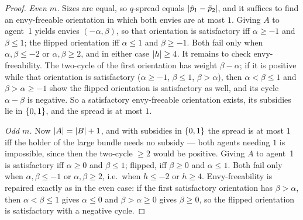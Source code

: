 \begin{proof}
\emph{Even $m$.} Sizes are equal, so $q$-spread equals
$\left\lvert\tilde{p}_1 - \tilde{p}_2\right\rvert$, and it suffices to find an
envy-freeable orientation in which both envies are at most $1$. Giving $A$ to
agent~1 yields envies $(-\alpha, \beta)$, so that orientation is satisfactory
iff $\alpha \ge -1$ and $\beta \le 1$; the flipped orientation iff
$\alpha \le 1$ and $\beta \ge -1$. Both fail only when $\alpha, \beta \le -2$
or $\alpha, \beta \ge 2$, and in either case $\left\lvert h\right\rvert \ge 4$. It remains to
check envy-freeability. The two-cycle of the first orientation has weight
$\beta - \alpha$; if it is positive while that orientation is satisfactory
($\alpha \ge -1$, $\beta \le 1$, $\beta > \alpha$), then $\alpha < \beta \le 1$
and $\beta > \alpha \ge -1$ show the flipped orientation is satisfactory as
well, and its cycle $\alpha - \beta$ is negative. So a satisfactory
envy-freeable orientation exists, its subsidies lie in $\left\{0,1\right\}$, and the
spread is at most $1$.

\emph{Odd $m$.} Now $\left\lvert A\right\rvert = \left\lvert B\right\rvert + 1$, and with subsidies in
$\left\{0,1\right\}$ the spread is at most $1$ iff the holder of the large bundle needs
no subsidy --- both agents needing $1$ is impossible, since then the two-cycle
$\ge 2$ would be positive. Giving $A$ to agent~1 is satisfactory iff
$\alpha \ge 0$ and $\beta \le 1$; flipped, iff $\beta \ge 0$ and
$\alpha \le 1$. Both fail only when $\alpha, \beta \le -1$ or
$\alpha, \beta \ge 2$, i.e.\ when $h \le -2$ or $h \ge 4$. Envy-freeability is
repaired exactly as in the even case: if the first satisfactory orientation
has $\beta > \alpha$, then $\alpha < \beta \le 1$ gives $\alpha \le 0$ and
$\beta > \alpha \ge 0$ gives $\beta \ge 0$, so the flipped orientation is
satisfactory with a negative cycle.
\end{proof}

